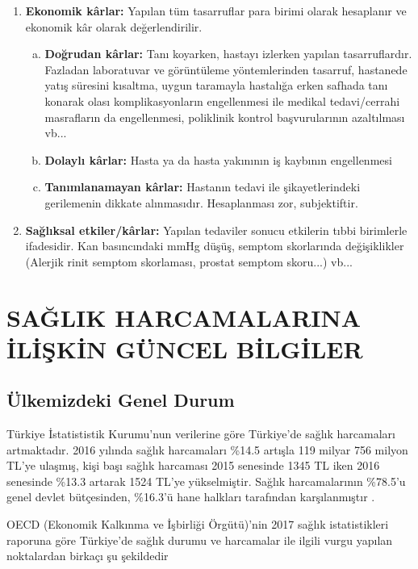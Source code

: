 \begin{enumerate}[1.]\itemsep-6pt
\item \textbf{Ekonomik kârlar:} Yapılan tüm tasarruflar para birimi olarak hesaplanır ve ekonomik kâr olarak değerlendirilir.
\begin{enumerate}[a.]\itemsep-6pt
\item \textbf{Doğrudan kârlar:} Tanı koyarken, hastayı izlerken yapılan tasarruflardır.  Fazladan laboratuvar ve görüntüleme yöntemlerinden tasarruf, hastanede yatış süresini kısaltma, uygun taramayla hastalığa erken safhada tanı konarak olası komplikasyonların engellenmesi ile medikal tedavi/cerrahi masrafların da engellenmesi, poliklinik kontrol başvurularının azaltılması vb...
\item \textbf{Dolaylı kârlar:} Hasta ya da hasta yakınının iş kaybının engellenmesi
\item \textbf{Tanımlanamayan kârlar:} Hastanın tedavi ile şikayetlerindeki gerilemenin dikkate alınmasıdır. Hesaplanması zor, subjektiftir.
\end{enumerate}
\item \textbf{Sağlıksal etkiler/kârlar:} Yapılan tedaviler sonucu etkilerin tıbbi birimlerle ifadesidir. Kan basıncındaki mmHg düşüş, semptom skorlarında değişiklikler (Alerjik rinit semptom skorlaması, prostat semptom skoru...) vb...
\end{enumerate}

\section{SAĞLIK HARCAMALARINA İLİŞKİN GÜNCEL BİLGİLER}

\subsection{Ülkemizdeki Genel Durum}

Türkiye İstatististik Kurumu’nun verilerine göre Türkiye’de sağlık harcamaları artmaktadır. 2016 yılında sağlık harcamaları \%14.5 artışla 119 milyar 756 milyon TL’ye ulaşmış, kişi başı sağlık harcaması 2015 senesinde 1345 TL iken 2016 senesinde \%13.3 artarak 1524 TL’ye yükselmiştir. Sağlık harcamalarının \%78.5'u genel devlet bütçesinden, \%16.3'ü hane halkları tarafından karşılanmıştır \cite{tuik2017}.

OECD (Ekonomik Kalkınma ve İşbirliği Örgütü)'nin 2017 sağlık istatistikleri raporuna göre Türkiye'de sağlık durumu ve harcamalar ile ilgili vurgu yapılan noktalardan birkaçı şu şekildedir \cite{oecd2017}

